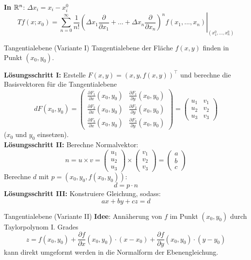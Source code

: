 \textbf{In $\mathbb{R}^n$}: $\Delta x_i = x_i - x_i^0$
\[
	Tf(x;x_0) = \left.\sum_{n=0}^\infty \frac{1}{n!}\left(\Delta x_1 \frac{\partial}{\partial x_1} + ... + \Delta x_n \frac{\partial}{\partial x_n} \right)^n 
		f(x_1, ..., x_n)\right|_{(x_1^0,...,x_n^0)}
\]

\begin{Rezept}{Tangentialebene (Variante I)}{}
    Tangentialebene der Fläche $f(x, y)$ finden in Punkt $(x_0, y_0)$.
    
    \textbf{Lösungsschritt I:}
    Erstelle $F(x, y) = (x, y, f(x, y))^\top$ und berechne die
    Basisvektoren für die Tangentialebene
    \[
        dF(x_0, y_0) =
            \begin{pmatrix}
                \frac{\partial F_1}{\partial x}(x_0, y_0)&\frac{\partial F_1}{\partial y}(x_0, y_0)\\
                \frac{\partial F_2}{\partial x}(x_0, y_0)&\frac{\partial F_2}{\partial y}(x_0, y_0)\\
                \frac{\partial F_3}{\partial x}(x_0, y_0)&\frac{\partial F_3}{\partial y}(x_0, y_0)
            \end{pmatrix} = 
            \begin{pmatrix}
                u_1&v_1\\
                u_2&v_2\\
                u_3&v_3
            \end{pmatrix}
    \]
    ($x_0$ und $y_0$ einsetzen).\\
    \textbf{Lösungsschritt II:}
    Berechne Normalvektor:
    \[
        n =
        u \times v =
        \begin{pmatrix}
            u_1\\
            u_2\\
            u_3
        \end{pmatrix}
        \times
        \begin{pmatrix}
            v_1\\
            v_2\\
            v_3
        \end{pmatrix} = 
        \begin{pmatrix}
            a\\
            b\\
            c
        \end{pmatrix}
    \]
    Berechne $d$ mit $p=(x_0,y_0,f(x_0,y_0))$:
    \[
        d=p \cdot n
    \]
    \textbf{Lösungsschritt III:} Konstruiere Gleichung, sodass:
    \[
        ax + by + cz = d
    \]
\end{Rezept}

\begin{Rezept}{Tangentialebene (Variante II)}{}
\textbf{Idee}: Annäherung von $f$ im Punkt $(x_0, y_0)$ durch Taylorpolynom I. Grades
\[ z = f(x_0, y_0) + \frac{\partial f}{\partial x}(x_0, y_0)\cdot(x-x_0) + \frac{\partial f}{\partial y}(x_0, y_0)\cdot(y-y_0) \]
kann direkt umgeformt werden in die Normalform der Ebenengleichung.
\end{Rezept}
